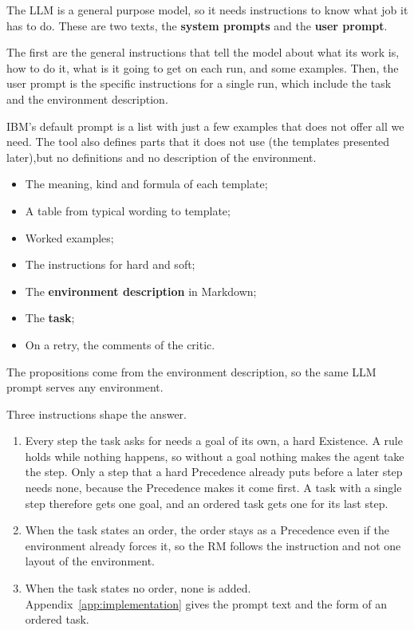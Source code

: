 \documentclass[11pt,english,listoffigures,listoftables]{tfgetsinf}
\begin{document}
The LLM is a general purpose model, so it needs instructions to know what job it has to do. These are two texts, the \textbf{system prompts} and the \textbf{user prompt}. 

The first are the general instructions that tell the model about what its work is, how to do it, what is it going to get on each run, and some examples. Then, the user prompt is the specific instructions for a single run, which include the task and the environment description.

IBM's default prompt is a list with just a few examples that does not offer all we need. The tool also defines parts that it does not use (the templates presented later),but no definitions and no description of the environment. 

\begin{itemize}
    \item The meaning, kind and formula of each template;
    \item A table from typical wording to template;
    \item Worked examples;
    \item The instructions for hard and soft;
    \item The \textbf{environment description} in Markdown;
    \item The \textbf{task};
    \item On a retry, the comments of the critic.
\end{itemize}

The propositions come from the environment description, so the same LLM prompt serves any environment.
    
Three instructions shape the answer. 
\begin{enumerate}
    \item Every step the task asks for needs a goal of its own, a hard Existence. A rule holds while nothing happens, so without a goal nothing makes the agent take the step. Only a step that a hard Precedence already puts before a later step needs none, because the Precedence makes it come first. A task with a single step therefore gets one goal, and an ordered task gets one for its last step.
    \item When the task states an order, the order stays as a Precedence even if the environment already forces it, so the RM follows the instruction and not one layout of the environment.
    \item When the task states no order, none is added. Appendix~\ref{app:implementation} gives the prompt text and the form of an ordered task.
\end{enumerate}
\end{document}
